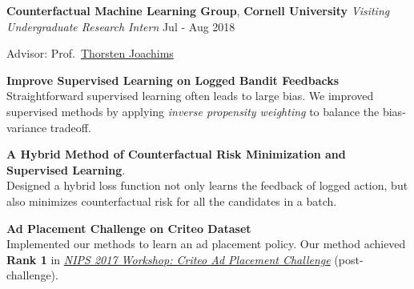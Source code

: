 \documentclass[12pt, letterpaper]{article}
\newenvironment{itemize*}%
{\begin{itemize}%
  \setlength{\itemsep}{0pt}}%
{\end{itemize}}
\newcommand{\rdate}[1]{{\addfontfeature{Numbers=OldStyle} \hfill #1}}
\begin{document}
\textbf{Counterfactual Machine Learning Group}, \textbf{Cornell University}\newline
\emph{Visiting Undergraduate Research Intern} \rdate{Jul - Aug 2018}
\begin{itemize*}
	\item Advisor: Prof.~\href{http://www.cs.cornell.edu/people/tj/}{Thorsten Joachims}
  \item \textbf{Improve Supervised Learning on Logged Bandit Feedbacks}\\
  Straightforward supervised learning often leads to large bias. We improved supervised methods by applying \emph{inverse propensity weighting} to balance the bias-variance tradeoff.
  \item \textbf{A Hybrid Method of C\small{ounterfactual} Risk Minimization and Supervised Learning}.\href{http://jinningli.cn/cv/cornell_writeup.pdf}{}\href{http://jinningli.cn/cv/cornell_presentation.pdf}{}\\
  Designed a hybrid loss function not only learns the feedback of logged action, but also minimizes counterfactual risk for all the candidates in a batch.
  \item \textbf{Ad Placement Challenge on Criteo Dataset}\href{https://github.com/jinningli/ad-placement-pytorch}{}\\
  Implemented our methods to learn an ad placement policy. Our method achieved \textbf{Rank 1} in \href{https://www.crowdai.org/challenges/nips-17-workshop-criteo-ad-placement-challenge}{\emph{NIPS 2017 Workshop: Criteo Ad Placement Challenge}} (post-challenge).
\end{itemize*}
\end{document}
